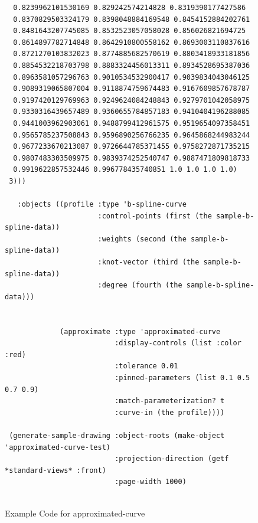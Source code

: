 \documentclass [11pt]{book}
\begin{document}
\begin{itemize}
\begin{figure}
\begin{lrbox}{\boxedverb}
\begin{minipage}{\linewidth}
{\begin{verbatim}
  0.8239962101530169 0.829242574214828 0.8319390177427586
  0.8370829503324179 0.8398048884169548 0.8454152884202761
  0.8481643207745085 0.8532523057058028 0.856026821694725
  0.8614897782714848 0.8642910800558162 0.8693003110837616
  0.8721270103832023 0.8774885682570619 0.8803418933181856
  0.8854532218703798 0.8883324456013311 0.8934528695387036
  0.8963581057296763 0.9010534532900417 0.9039834043046125
  0.9089319065807004 0.9118874759674483 0.9167609857678787
  0.9197420129769963 0.9249624084248843 0.9279701042058975
  0.9330316439657489 0.9360655784857183 0.9410404196288085
  0.9441003962903061 0.9488799412961575 0.9519654097358451
  0.9565785237508843 0.9596890256766235 0.9645868244983244
  0.9677233670213087 0.9726644785371455 0.9758272871735215
  0.9807483303509975 0.9839374252540747 0.9887471809818733
  0.9919622857532446 0.996778435740851 1.0 1.0 1.0 1.0)
 3)))
  
   :objects ((profile :type 'b-spline-curve
                      :control-points (first (the sample-b-spline-data))
                      :weights (second (the sample-b-spline-data))
                      :knot-vector (third (the sample-b-spline-data))
                      :degree (fourth (the sample-b-spline-data)))

            
             (approximate :type 'approximated-curve
                          :display-controls (list :color :red)
                          :tolerance 0.01
                          :pinned-parameters (list 0.1 0.5 0.7 0.9)
                          :match-parameterization? t
                          :curve-in (the profile))))

 (generate-sample-drawing :object-roots (make-object 'approximated-curve-test)
                          :projection-direction (getf *standard-views* :front)
                          :page-width 1000)


\end{verbatim}}
\end{minipage}
\end{lrbox}
\fbox{\usebox{\boxedverb}}

\caption{Example Code for approximated-curve}

\label{fig:example-code-approximated-curve}

\end{figure}


\end{itemize}
\end{document}

